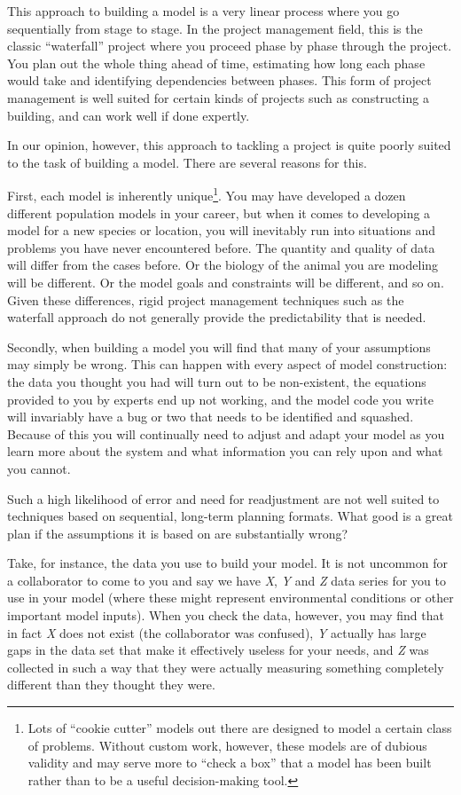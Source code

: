 \documentclass[]{memoir}
\begin{document}
This approach to building a model is a very linear process where you go
sequentially from stage to stage. In the project management field, this
is the classic ``waterfall'' project where you proceed phase by phase
through the project. You plan out the whole thing ahead of time,
estimating how long each phase would take and identifying dependencies
between phases. This form of project management is well suited for
certain kinds of projects such as constructing a building, and can work
well if done expertly.

In our opinion, however, this approach to tackling a project is quite
poorly suited to the task of building a model. There are several reasons
for this.

First, each model is inherently unique\footnote{Lots of ``cookie
  cutter'' models out there are designed to model a certain class of
  problems. Without custom work, however, these models are of dubious
  validity and may serve more to ``check a box'' that a model has been
  built rather than to be a useful decision-making tool.}. You may have
developed a dozen different population models in your career, but when
it comes to developing a model for a new species or location, you will
inevitably run into situations and problems you have never encountered
before. The quantity and quality of data will differ from the cases
before. Or the biology of the animal you are modeling will be different.
Or the model goals and constraints will be different, and so on. Given
these differences, rigid project management techniques such as the
waterfall approach do not generally provide the predictability that is
needed.

Secondly, when building a model you will find that many of your
assumptions may simply be wrong. This can happen with every aspect of
model construction: the data you thought you had will turn out to be
non-existent, the equations provided to you by experts end up not
working, and the model code you write will invariably have a bug or two
that needs to be identified and squashed. Because of this you will
continually need to adjust and adapt your model as you learn more about
the system and what information you can rely upon and what you cannot.

Such a high likelihood of error and need for readjustment are not well
suited to techniques based on sequential, long-term planning formats.
What good is a great plan if the assumptions it is based on are
substantially wrong?

Take, for instance, the data you use to build your model. It is not
uncommon for a collaborator to come to you and say we have \emph{X},
\emph{Y} and \emph{Z} data series for you to use in your model (where
these might represent environmental conditions or other important model
inputs). When you check the data, however, you may find that in fact
\emph{X} does not exist (the collaborator was confused), \emph{Y}
actually has large gaps in the data set that make it effectively useless
for your needs, and \emph{Z} was collected in such a way that they were
actually measuring something completely different than they thought they
were.
\end{document}
